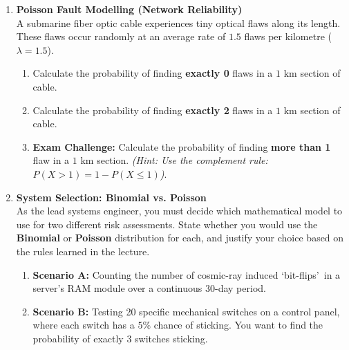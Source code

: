 \begin{enumerate}[label=\textbf{Q\arabic*.}, leftmargin=*, start=4]
    \item \textbf{Poisson Fault Modelling (Network Reliability)} \\
    A submarine fiber optic cable experiences tiny optical flaws along its length. These flaws occur randomly at an average rate of $1.5$ flaws per kilometre ($\lambda = 1.5$).
    \begin{enumerate}[label=\arabic*.]
        \item Calculate the probability of finding \textbf{exactly 0} flaws in a $1\text{ km}$ section of cable.
        \item Calculate the probability of finding \textbf{exactly 2} flaws in a $1\text{ km}$ section of cable.
        \item \textbf{Exam Challenge:} Calculate the probability of finding \textbf{more than 1} flaw in a $1\text{ km}$ section. \textit{(Hint: Use the complement rule: $P(X > 1) = 1 - P(X \leq 1)$)}.
    \end{enumerate}
    \vspace{0.3cm}

    \item \textbf{System Selection: Binomial vs. Poisson} \\
    As the lead systems engineer, you must decide which mathematical model to use for two different risk assessments. State whether you would use the \textbf{Binomial} or \textbf{Poisson} distribution for each, and justify your choice based on the rules learned in the lecture.
    \begin{enumerate}[label=\arabic*.]
        \item \textbf{Scenario A:} Counting the number of cosmic-ray induced \lq bit-flips\rq\ in a server's RAM module over a continuous 30-day period.
        \item \textbf{Scenario B:} Testing 20 specific mechanical switches on a control panel, where each switch has a $5\%$ chance of sticking. You want to find the probability of exactly 3 switches sticking.
    \end{enumerate}

\end{enumerate}
